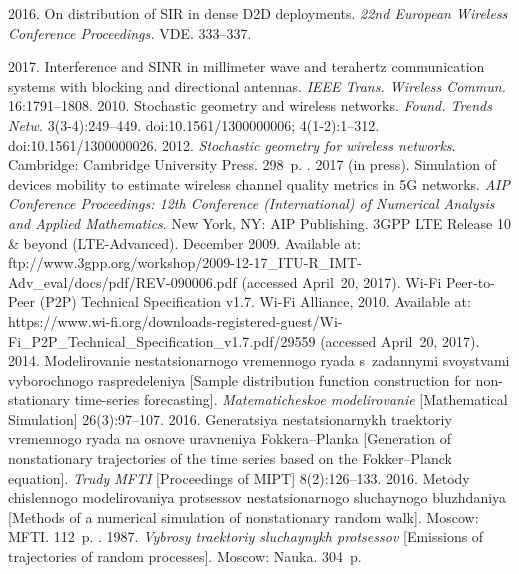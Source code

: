 \begin{multicols}{2}
{{\begin{thebibliography}{99}
 2016. On distribution of SIR in dense D2D deployments. \textit{22nd 
European Wireless Conference Proceedings.} VDE.
333--337.

 2017. Interference and SINR in millimeter
wave and terahertz communication systems with 
blocking and directional antennas. \textit{IEEE Trans. Wireless Commun.}
16:1791--1808. %
 2010. Stochastic geometry and wireless networks. 
\textit{Found. Trends Netw.} 3(3-4):249--449. 
doi:10.1561/1300000006;  4(1-2):1--312. 
doi:10.1561/1300000026.
 2012. \textit{Stochastic geometry for wireless networks}. Cambridge: 
Cambridge University Press. 298~p.
. 2017 (in press). Simulation of devices mobility to estimate wireless channel quality 
metrics in 5G networks. \textit{AIP Conference Proceedings: 12th Conference (International) of 
Numerical Analysis and Applied Mathematics}. New York, NY: 
AIP Publishing. 
3GPP LTE Release 10 \& beyond (LTE-Advanced).  December 2009. Available at: {\sf 
ftp://www.3gpp.org/\linebreak workshop/2009-12-17\_ITU-R\_IMT-Adv\_eval/docs/pdf/\linebreak REV-090006.pdf} (accessed 
April~20, 2017).
Wi-Fi Peer-to-Peer (P2P) Technical Specification v1.7.   Wi-Fi Alliance, 2010. Available at: {\sf 
https://www.wi-fi.\linebreak org/downloads-registered-guest/Wi-Fi\_P2P\_Technical\_\linebreak Specification\_v1.7.pdf/29559} 
(accessed April~20, 2017).
 2014. Modelirovanie 
nestatsionarnogo vremennogo ryada s~zadannymi svoystvami vyborochnogo raspredeleniya 
[Sample distribution function construction for non-stationary
time-series forecasting]. 
\textit{Matematicheskoe mo\-de\-li\-ro\-va\-nie} [Mathematical Simulation] 26(3):97--107.
 2016. Generatsiya ne\-sta\-tsi\-o\-nar\-nykh traektoriy 
vremennogo ryada na osnove uravneniya Fokkera--Planka [Generation of nonstationary 
trajectories of the time series based on the Fokker--Planck equation]. \textit{Trudy MFTI} 
[Proceedings of MIPT] 8(2):126--133.
 2016. Metody chislennogo modelirovaniya protsessov 
nestatsionarnogo sluchaynogo bluzhdaniya [Methods of a numerical simulation of nonstationary 
random walk]. Moscow: MFTI. 112~p.
. 1987. \textit{Vybrosy traektoriy sluchaynykh 
protsessov} [Emissions of trajectories of random processes]. Moscow: Nauka. 304~p.


\end{thebibliography}}}
\end{multicols}
